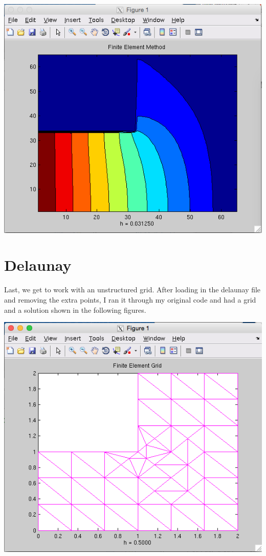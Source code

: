 \documentclass[11pt, oneside]{article}   	%
\begin{document}
\vspace{5mm}

\centerline{\includegraphics[scale = 0.55]{FEM_contour.png}}

\vspace{5mm}

\section{Delaunay}

Last, we get to work with an unstructured grid. After loading in the delaunay file and removing the extra points, I ran it through my original code and had a grid and a solution shown in the following figures. \\

\centerline{\includegraphics[scale = 0.55]{UnstructuredGrid.png}}
\end{document}

